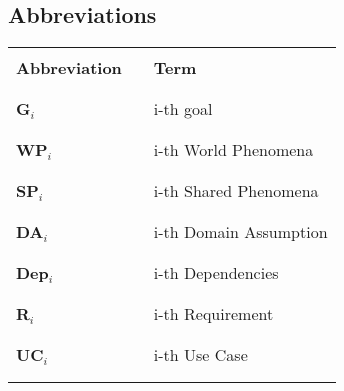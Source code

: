 \subsection{Abbreviations}
\begin{table}[H]
    \centering
    \renewcommand{\arraystretch}{0.5}
    \begin{tabular}{l l p{10.5cm}}
        \hline
                              &        &                            \\
        \textbf{Abbreviation} & \vline & \textbf{Term}              \\
                              &        &                            \\\hline & & \\
        \textbf{G}\(_i\)      & \vline & i-th goal                  \\
                              &        &                            \\\hline & & \\
        \textbf{WP}\(_i\)     & \vline & i-th World Phenomena       \\
                              &        &                            \\\hline & & \\
        \textbf{SP}\(_i\)     & \vline & i-th Shared Phenomena      \\
                              &        &                            \\\hline & & \\
        \textbf{DA}\(_i\)     & \vline & i-th Domain Assumption     \\
                              &        &                            \\\hline & & \\
        \textbf{Dep}\(_i\)    & \vline & i-th Dependencies          \\
                              &        &                            \\\hline & & \\
        \textbf{R}\(_i\)      & \vline & i-th Requirement           \\
                              &        &                            \\\hline & & \\
        \textbf{UC}\(_i\)     & \vline & i-th Use Case              \\
                              &        &                            \\\hline & & \\

\end{tabular}
\end{table}
